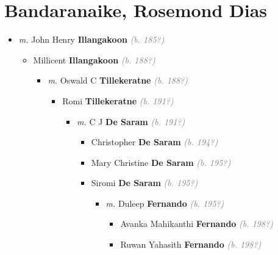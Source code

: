 \documentclass[10pt, openany]{book}
\begin{document}
\chapter{Bandaranaike, Rosemond Dias}
\label{00001423}
\textcolor{slmaroon}{\textit{}}
\begin{itemize}
\item{\textit{m.} John Henry \textbf{Illangakoon} \textcolor{gray}{\textit{(b. 185?)}}   \label{couple:00001423:00001424} \begin{itemize}
\item{Millicent \textbf{Illangakoon} \textcolor{gray}{\textit{(b. 188?)}}
\begin{itemize}
\item{\textit{m.} Oswald C \textbf{Tillekeratne} \textcolor{gray}{\textit{(b. 188?)}}   \label{couple:00001425:00001426} \begin{itemize}
\item{Romi \textbf{Tillekeratne} \textcolor{gray}{\textit{(b. 191?)}}
\begin{itemize}
\item{\textit{m.} C J  \textbf{De Saram} \textcolor{gray}{\textit{(b. 191?)}}   \label{couple:00001427:00001428} \begin{itemize}
\item{Christopher \textbf{De Saram} \textcolor{gray}{\textit{(b. 194?)}}
  }
\item{Mary Christine \textbf{De Saram} \textcolor{gray}{\textit{(b. 195?)}}
   }
\item{Siromi \textbf{De Saram} \textcolor{gray}{\textit{(b. 195?)}}
\begin{itemize}
\item{\textit{m.} Duleep \textbf{Fernando} \textcolor{gray}{\textit{(b. 195?)}}   \label{couple:00001432:00001433} \begin{itemize}
\item{Avanka Mahikanthi \textbf{Fernando} \textcolor{gray}{\textit{(b. 198?)}}
  }
\item{Ruwan Yahasith \textbf{Fernando} \textcolor{gray}{\textit{(b. 198?)}}
  }
\end{itemize}}
\end{itemize}
  }
\end{itemize}}
\end{itemize}
 }

\end{itemize}}
\end{itemize}}
\end{itemize}}
\end{itemize}
\end{document}
